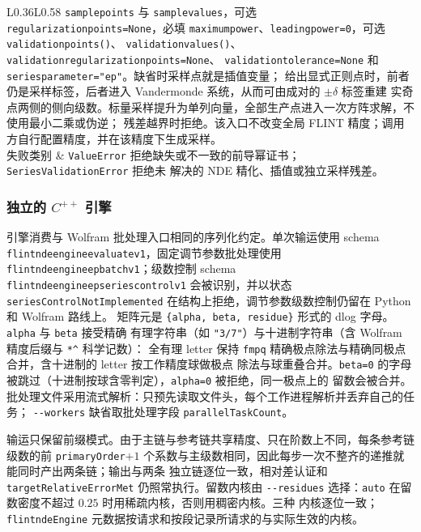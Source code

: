 \documentclass[11pt,a4paper]{ctexart}
\renewcommand{\_}{\origunderscore\allowbreak}
\begin{document}
\begin{longtable}{L{0.36\textwidth}L{0.58\textwidth}}
\texttt{sample\_points} 与 \texttt{sample\_values}，可选 \texttt{regularization\_points=None}，必填
\texttt{maximum\_power}、\texttt{leading\_power=0}，可选 \texttt{validation\_points()}、
\texttt{validation\_values()}、\texttt{validation\_regularization\_points=None}、
\texttt{validation\_tolerance=None} 和 \texttt{series\_parameter="ep"}。缺省时采样点就是插值变量；
给出显式正则点时，前者仍是采样标签，后者进入 Vandermonde 系统，从而可由成对的 $\pm\delta$ 标签重建
实奇点两侧的侧向级数。标量采样提升为单列向量，全部生产点进入一次方阵求解，不使用最小二乘或伪逆；
残差越界时拒绝。该入口不改变全局 FLINT 精度；调用方自行配置精度，并在该精度下生成采样。\\
失败类别 & \texttt{ValueError} 拒绝缺失或不一致的前导幂证书；\texttt{SeriesValidationError} 拒绝未
解决的 NDE 精化、插值或独立采样残差。\\
\bottomrule
\end{longtable}
\normalsize

\subsubsection{独立的 \texorpdfstring{$C^{++}$}{C++} 引擎}
\label{subsec:engine}

引擎消费与 Wolfram 批处理入口相同的序列化约定。单次输运使用 schema
\texttt{flintnde\_engine\_evaluate\_v1}，固定调节参数批处理使用
\texttt{flintnde\_engine\_ep\_batch\_v1}；级数控制 schema
\texttt{flintnde\_engine\_ep\_series\_control\_v1} 会被识别，并以状态
\texttt{series\allowbreak Control\allowbreak Not\allowbreak Implemented} 在结构上拒绝，调节参数级数控制仍留在 Python 和 Wolfram 路线上。
矩阵元是 \texttt{\{alpha, beta, residue\}} 形式的 dlog 字母。\texttt{alpha} 与 \texttt{beta} 接受精确
有理字符串（如 \texttt{"3/7"}）与十进制字符串（含 Wolfram 精度后缀与
\texttt{*\textasciicircum} 科学记数）：
全有理 letter 保持 \texttt{fmpq} 精确极点除法与精确同极点合并，含十进制的 letter 按工作精度球做极点
除法与球重叠合并。\texttt{beta=0} 的字母被跳过（十进制按球含零判定），\texttt{alpha=0} 被拒绝，同一极点上的
留数会被合并。批处理文件采用流式解析：只预先读取文件头，每个工作进程解析并丢弃自己的任务；
\texttt{-{}-workers} 缺省取批处理字段 \texttt{parallel\allowbreak Task\allowbreak Count}。

输运只保留前缀模式。由于主链与参考链共享精度、只在阶数上不同，每条参考链级数的前
\texttt{primaryOrder}$+1$ 个系数与主级数相同，因此每步一次不整齐的递推就能同时产出两条链；输出与两条
独立链逐位一致，相对差认证和 \texttt{targetRelativeErrorMet} 仍照常执行。留数内核由
\texttt{-{}-residues} 选择：\texttt{auto} 在留数密度不超过 $0.25$ 时用稀疏内核，否则用稠密内核。三种
内核逐位一致；\texttt{flintndeEngine} 元数据按请求和按段记录所请求的与实际生效的内核。
\end{document}
